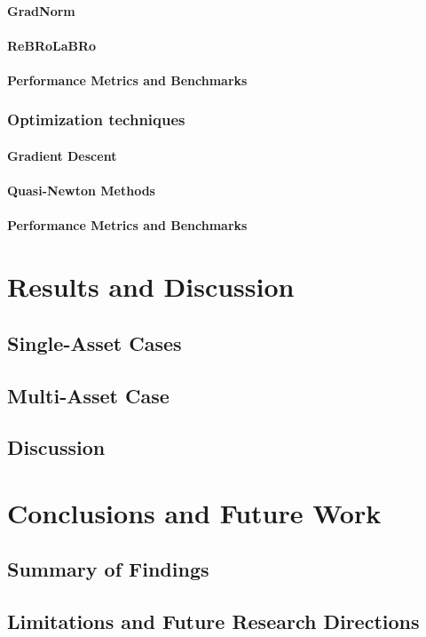\documentclass[12pt]{report} %
\theoremstyle{plain}           %
\theoremstyle{definition}      %
\theoremstyle{remark}          %
\begin{document}
\subsubsection{GradNorm}

\subsubsection{ReBRoLaBRo}

\subsubsection{Performance Metrics and Benchmarks}

\subsection{Optimization techniques}

\subsubsection{Gradient Descent}
\subsubsection{Quasi-Newton Methods}
\subsubsection{Performance Metrics and Benchmarks}

\chapter{Results and Discussion}
\section{Single-Asset Cases}
\section{Multi-Asset Case}
\section{Discussion}

\chapter{Conclusions and Future Work}
\section{Summary of Findings}
\section{Limitations and Future Research Directions}


\clearpage
{}

\printbibliography
\end{document}
